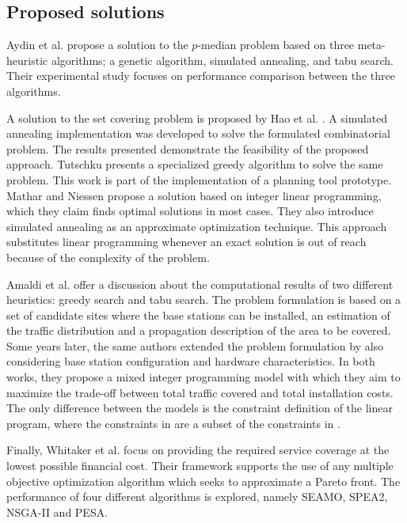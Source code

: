 \subsection{Proposed solutions}

Aydin et al. \cite{Aydin:Heuristic.Optimization.Of.WCDMA} propose
a solution to the $p$-median problem based on three meta-heuristic
algorithms; a genetic algorithm, simulated annealing, and tabu search.
Their experimental study focuses on performance comparison between
the three algorithms.

A solution to the set covering problem is proposed by Hao et al. \cite{minimum.set.covering.problem:1997}.
A simulated annealing implementation was developed to solve the formulated
combinatorial problem. The results presented demonstrate the feasibility
of the proposed approach. Tutschku \cite{minimum.set.covering.problem:1998}
presents a specialized greedy algorithm to solve the same problem.
This work is part of the implementation of a planning tool prototype.
Mathar and Niessen \cite{minimum.set.covering.problem:2000} propose
a solution based on integer linear programming, which they claim finds
optimal solutions in most cases. They also introduce simulated annealing
as an approximate optimization technique. This approach substitutes
linear programming whenever an exact solution is out of reach because
of the complexity of the problem.

Amaldi et al. \cite{amaldi:planning.umts.base.station.location} offer
a discussion about the computational results of two different heuristics:
greedy search and tabu search. The problem formulation is based on
a set of candidate sites where the base stations can be installed,
an estimation of the traffic distribution and a propagation description
of the area to be covered. Some years later, the same authors \cite{Amaldi:Radio.planning.and.coveraga.optimization}
extended the problem formulation by also considering base station
configuration and hardware characteristics. In both works, they propose
a mixed integer programming model with which they aim to maximize
the trade-off between total traffic covered and total installation
costs. The only difference between the models is the constraint definition
of the linear program, where the constraints in \cite{amaldi:planning.umts.base.station.location}
are a subset of the constraints in \cite{Amaldi:Radio.planning.and.coveraga.optimization}.

Finally, Whitaker et al. \cite{GA.for.antenna.placement:2005} focus
on providing the required service coverage at the lowest possible
financial cost. Their framework supports the use of any multiple objective
optimization algorithm which seeks to approximate a Pareto front.
The performance of four different algorithms is explored, namely SEAMO,
SPEA2, NSGA-II and PESA.


